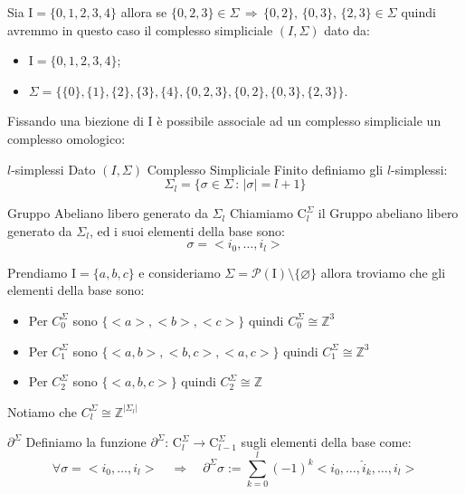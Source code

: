 \documentclass[11pt, a4paper, twoside]{article}
\begin{document}
\begin{es}
	Sia $\text{I}=\{0,1,2,3,4\}$ allora se $\{0,2,3\}\in\Sigma\,\Rightarrow\,\{0,2\},\,\{0,3\},\,\{2,3\}\in\Sigma$ quindi avremmo in questo caso il complesso simpliciale $(I,\Sigma)$ dato da: 
	\begin{itemize}
		\item  $\text{I}=\{0,1,2,3,4\}$;
		\item  $\Sigma=\{\{0\},\{1\},\{2\},\{3\},\{4\},\{0,2,3\},\{0,2\},\{0,3\},\{2,3\}\}$.
	\end{itemize} 
\end{es}

Fissando una biezione di I è possibile associale ad un complesso simpliciale un complesso omologico: 
\begin{defn}{$l$-simplessi}{}
	Dato $(I,\Sigma)$ Complesso Simpliciale Finito definiamo gli $l$-simplessi:
	\[
		\Sigma_{l}=\{\sigma\in\Sigma\,:\,|\sigma|=l+1\}
	\]
\end{defn}

\begin{defn}{Gruppo Abeliano libero generato da $\Sigma_{l}$}{}
	Chiamiamo $\text{C}_l^{\Sigma}$ il Gruppo abeliano libero generato da $\Sigma_{l}$, ed i suoi elementi della base sono: 
	\[
		\sigma=<i_0,\dots,i_l>
	\]
\end{defn}

\begin{es}\label{es 10}
	Prendiamo $\text{I}=\{a,b,c\}$ e consideriamo $\Sigma=\mathscr{P}(\text{I})\setminus\{\varnothing\}$ allora troviamo che gli elementi della base sono:
	\begin{itemize}
		\item Per $C_0^{\Sigma}$ sono $\{<a>,<b>,<c>\}$ quindi $C_0^{\Sigma}\cong \mathbb{Z}^3$
		\item Per $C_1^{\Sigma}$ sono $\{<a,b>,<b,c>,<a,c>\}$ quindi $C_1^{\Sigma}\cong \mathbb{Z}^3$
		\item Per $C_2^{\Sigma}$ sono $\{<a,b,c>\}$ quindi $C_2^{\Sigma}\cong \mathbb{Z}$
	\end{itemize}
\end{es}

\begin{oss}
	Notiamo che $C_l^{\Sigma}\cong \mathbb{Z}^{|\Sigma_l|}$
\end{oss}

\begin{defn}{$\partial^\Sigma$}{}
	Definiamo la funzione $\partial^\Sigma:\,\text{C}_l^{\Sigma}\rightarrow\text{C}_{l-1}^{\Sigma}$ sugli elementi della base come: 
	\[
		\forall\sigma=<i_0,\dots,i_l>\quad \Rightarrow\quad\partial^\Sigma\sigma:=\sum\limits_{k=0}^l (-1)^k <i_0,\dots,\hat{i}_k,\dots,i_l>
	\]
\end{defn}
\end{document}
